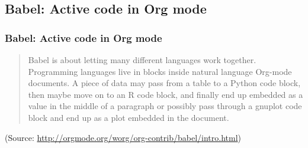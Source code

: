 \documentclass[bigger]{beamer}
\begin{document}
\subsection{Babel: Active code in Org mode}
\label{sec-2-4}
\begin{frame}
\frametitle{Babel: Active code in Org mode}
\label{sec-2-4-1}


\begin{quote}
Babel is about letting many different languages work together. Programming languages live in blocks inside natural language Org-mode documents. A piece of data may pass from a table to a Python code block, then maybe move on to an R code block, and finally end up embedded as a value in the middle of a paragraph or possibly pass through a gnuplot code block and end up as a plot embedded in the document.
\end{quote}

(Source: \href{http://orgmode.org/worg/org-contrib/babel/intro.html}{http://orgmode.org/worg/org-contrib/babel/intro.html})
\end{frame}
\end{document}
